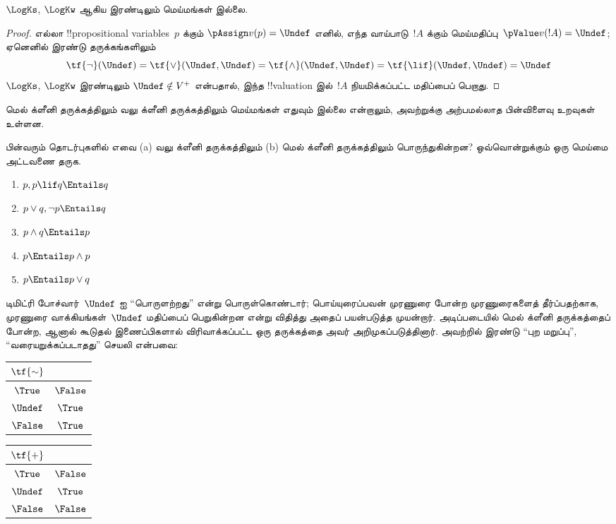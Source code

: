 \documentclass[../../../include/open-logic-section]{subfiles}
\begin{document}
\begin{prop}
  $\LogKs$, $\LogKw$ ஆகிய இரண்டிலும் மெய்மங்கள் இல்லை.
\end{prop}

\begin{proof}
  எல்லா !!{propositional variable}s~$p$ க்கும்
  $\pAssign v(p) = \Undef$ எனில், எந்த வாய்பாடு~$!A$ க்கும்
  மெய்மதிப்பு~$\pValue v(!A) = \Undef$; ஏனெனில் இரண்டு தருக்கங்களிலும்
  \[
    \tf{\lnot}(\Undef) = \tf{\lor}(\Undef, \Undef) = \tf{\land}(\Undef,
  \Undef) = \tf{\lif}(\Undef, \Undef) = \Undef
  \]
  $\LogKs$, $\LogKw$ இரண்டிலும் $\Undef \notin V^+$ என்பதால், இந்த
  !!{valuation} இல்~$!A$ நியமிக்கப்பட்ட மதிப்பைப் பெறாது.
\end{proof}

மெல் க்ளீனி தருக்கத்திலும் வலு க்ளீனி தருக்கத்திலும் மெய்மங்கள் எதுவும்
இல்லை என்றாலும், அவற்றுக்கு அற்பமல்லாத பின்விளைவு உறவுகள் உள்ளன.

\begin{prob}
  பின்வரும் தொடர்புகளில் எவை (a) வலு க்ளீனி தருக்கத்திலும்
  (b) மெல் க்ளீனி தருக்கத்திலும் பொருந்துகின்றன? ஒவ்வொன்றுக்கும் ஒரு மெய்மை
  அட்டவணை தருக.
  \begin{enumerate}
    \item $p, p \lif q \Entails q$
    \item $p \lor q, \lnot p \Entails q$
    \item $p \land q \Entails p$
    \item $p \Entails p \land p$
    \item $p \Entails p \lor q$
  \end{enumerate}
\end{prob}

டிமிட்ரி போச்வார்~$\Undef$ ஐ ``பொருளற்றது'' என்று பொருள்கொண்டார்;
பொய்யுரைப்பவன் முரணுரை போன்ற முரணுரைகளைத் தீர்ப்பதற்காக, முரணுரை
வாக்கியங்கள்~$\Undef$ மதிப்பைப் பெறுகின்றன என்று விதித்து அதைப் பயன்படுத்த
முயன்றார். அடிப்படையில் மெல் க்ளீனி தருக்கத்தைப் போன்ற, ஆனால் கூடுதல்
இணைப்பிகளால் விரிவாக்கப்பட்ட ஒரு தருக்கத்தை அவர் அறிமுகப்படுத்தினார்.
அவற்றில் இரண்டு ``புற மறுப்பு'', ``வரையறுக்கப்படாதது'' செயலி என்பவை:
\begin{center}
  \begin{tabular}{c|c}
    $\tf{\sim}$ & \\
    \hline
    $\True$ & $\False$ \\
    $\Undef$ & $\True$ \\
    $\False$ & $\True$
  \end{tabular}
\quad
  \begin{tabular}{c|c}
    $\tf{+}$ & \\
    \hline
    $\True$ & $\False$ \\
    $\Undef$ & $\True$ \\
    $\False$ & $\False$
  \end{tabular}
\end{center}
\end{document}
